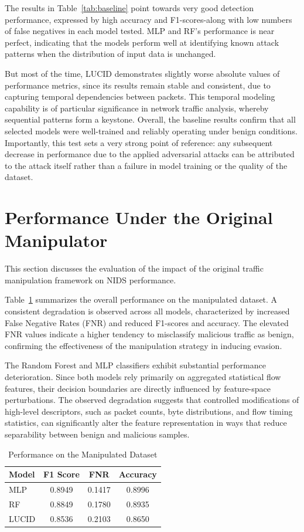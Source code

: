 The results in Table~\ref{tab:baseline} point towards very good detection performance, expressed by high accuracy and F1-scores-along with low numbers of false negatives in each model tested.
MLP and RF's performance is near perfect, indicating that the models perform well at identifying known attack patterns when the distribution of input data is unchanged.

But most of the time, LUCID demonstrates slightly worse absolute values of performance metrics, since its results remain stable and consistent, due to capturing temporal dependencies between packets.
This temporal modeling capability is of particular significance in network traffic analysis, whereby sequential patterns form a keystone. Overall, the baseline results confirm that all selected models were well-trained and reliably operating under benign conditions. Importantly, this test sets a very strong point of reference: any subsequent decrease in performance due to the applied adversarial attacks can be attributed to the attack itself rather than a failure in model training or the quality of the dataset.

\section{Performance Under the Original Manipulator}

This section discusses the evaluation of the impact of the original traffic manipulation framework on NIDS performance.

Table~\ref{tab:manipulated} summarizes the overall performance on the manipulated dataset. A consistent degradation is observed across all models, characterized by increased False Negative Rates (FNR) and reduced F1-scores and accuracy. The elevated FNR values indicate a higher tendency to misclassify malicious traffic as benign, confirming the effectiveness of the manipulation strategy in inducing evasion.

The Random Forest and MLP classifiers exhibit substantial performance deterioration. Since both models rely primarily on aggregated statistical flow features, their decision boundaries are directly influenced by feature-space perturbations. The observed degradation suggests that controlled modifications of high-level descriptors, such as packet counts, byte distributions, and flow timing statistics, can significantly alter the feature representation in ways that reduce separability between benign and malicious samples.

\begin{table}[h]
\centering
\begin{tabular}{lccc}
\hline
Model & F1 Score & FNR & Accuracy \\
\hline
MLP   & 0.8949 & 0.1417 & 0.8996 \\
RF    & 0.8849 & 0.1780 & 0.8935 \\
LUCID & 0.8536 & 0.2103 & 0.8650 \\
\hline
\end{tabular}
\caption{Performance on the Manipulated Dataset}
\label{tab:manipulated}
\end{table}

